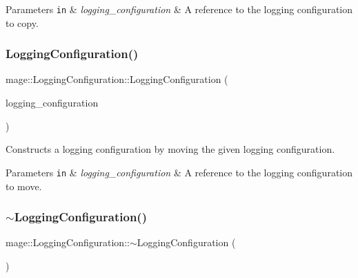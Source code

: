 \begin{DoxyParams}[1]{Parameters}
\mbox{\tt in}  & {\em logging\+\_\+configuration} & A reference to the logging configuration to copy. \\
\hline
\end{DoxyParams}
\hypertarget{classmage_1_1_logging_configuration_ad5d3dd901720450fcf57d4b1b32fce15}{}\label{classmage_1_1_logging_configuration_ad5d3dd901720450fcf57d4b1b32fce15} 
\subsubsection{\texorpdfstring{Logging\+Configuration()}{LoggingConfiguration()}\hspace{0.1cm}{\footnotesize\ttfamily [3/3]}}
{\footnotesize\ttfamily mage\+::\+Logging\+Configuration\+::\+Logging\+Configuration (\begin{DoxyParamCaption}\item[{\hyperlink{classmage_1_1_logging_configuration}{Logging\+Configuration} \&\&}]{logging\+\_\+configuration }\end{DoxyParamCaption})\hspace{0.3cm}{\ttfamily [default]}}

Constructs a logging configuration by moving the given logging configuration.


\begin{DoxyParams}[1]{Parameters}
\mbox{\tt in}  & {\em logging\+\_\+configuration} & A reference to the logging configuration to move. \\
\hline
\end{DoxyParams}
\hypertarget{classmage_1_1_logging_configuration_a842cd1d5cf22c9fb6e2c76e684cd08ee}{}\label{classmage_1_1_logging_configuration_a842cd1d5cf22c9fb6e2c76e684cd08ee} 
\subsubsection{\texorpdfstring{$\sim$\+Logging\+Configuration()}{~LoggingConfiguration()}}
{\footnotesize\ttfamily mage\+::\+Logging\+Configuration\+::$\sim$\+Logging\+Configuration (\begin{DoxyParamCaption}{ }\end{DoxyParamCaption})\hspace{0.3cm}{\ttfamily [default]}}

